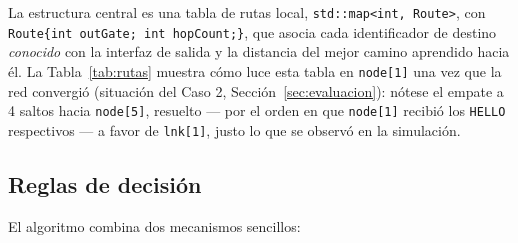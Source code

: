 \documentclass[10pt,letterpaper,twocolumn]{article}
\newcommand{\coltablesetup}{%
  \scriptsize
  \setlength{\tabcolsep}{3pt}%
  \renewcommand{\arraystretch}{1.08}%
}
\begin{document}
La estructura central es una tabla de rutas local,
\texttt{std::map<int, Route>}, con \texttt{Route\{int outGate; int hopCount;\}},
que asocia cada identificador de destino \emph{conocido} con la interfaz de
salida y la distancia del mejor camino aprendido hacia él. La
Tabla~\ref{tab:rutas} muestra cómo luce esta tabla en \texttt{node[1]} una vez
que la red convergió (situación del Caso 2, Sección~\ref{sec:evaluacion}):
nótese el empate a 4 saltos hacia \texttt{node[5]}, resuelto --- por el orden
en que \texttt{node[1]} recibió los \texttt{HELLO} respectivos --- a favor de
\texttt{lnk[1]}, justo lo que se observó en la simulación.

\begin{table}[!ht]
  \centering
  \caption{Tabla de rutas de \texttt{node[1]} una vez convergido el descubrimiento.}
  \label{tab:rutas}
  \coltablesetup
\end{table}

\subsection{Reglas de decisión}

El algoritmo combina dos mecanismos sencillos:
\end{document}
